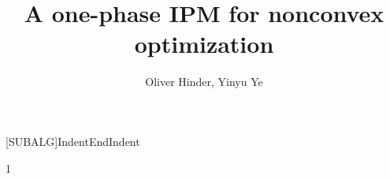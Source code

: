 \documentclass{article}
\begin{document}
\title{A one-phase IPM for nonconvex optimization}
\author{Oliver Hinder, Yinyu Ye}

[SUBALG]{Indent}{EndIndent}{}{\algorithmicend\ }%

\maketitle


\def\inProgress{0}

\if\inProgress1
\newcommand{\inProgressHide}[1]{#1} %
\newcommand{\yinyu}[1]{{\color{red} Yinyu: #1}}
\newcommand{\hinder}[1]{{\color{red}{Hinder: #1}}}
\newcommand{\ron}[1]{ {\color{orange}Ron:  #1}}
\else
\newcommand{\inProgressHide}[1]{} %
\newcommand{\yinyu}[1]{}
\newcommand{\hinder}[1]{}
\newcommand{\ron}[1]{}
\fi


\newcommand{\kStart}{k_{\text{start}}}
\newcommand{\kEnd}{k_{\text{end}}}

\newcommand{\algorithmicbreak}{\textbf{break}}
\newcommand{\obj}{f}
\newcommand{\cons}{a}
\newcommand{\hess}{\grad^2}
\newcommand{\nvar}{n}
\newcommand{\ncon}{m}

\renewcommand{\vec}[1]{#1}

\newcommand{\eye}{I}
\newcommand{\ones}{\vec{e}}
\newcommand{\dir}[1]{\vec{d}_{\vec{#1}}}
\newcommand{\Dir}[1]{D_{\vec{#1}}}


\newcommand{\LDL}{LDL}
\newcommand{\LBL}{LBL}



\newcommand{\parNumCor}{j_{\max}}
\newcommand{\parNumCorValue}{3}




\newcommand{\parConRegularizer}{\beta_{1}}
\newcommand{\parConRegularizerValue}{10^{-4}}
\newcommand{\parConRegularizerInterval}{(0,1)}

\newcommand{\parComp}{\beta_{2}}
\newcommand{\parCompValue}{0.01}
\newcommand{\parCompInterval}{(0,1)}

\newcommand{\parCompAgg}{\beta_{3}}
\newcommand{\parCompAggValue}{0.02}
\newcommand{\parCompAggInterval}{(\parComp,1)}

\newcommand{\parObjReductFactor}{\beta_{4}}
\newcommand{\parObjReductFactorValue}{0.2}
\newcommand{\parObjReductFactorInterval}{(0,1)}
\end{document}
